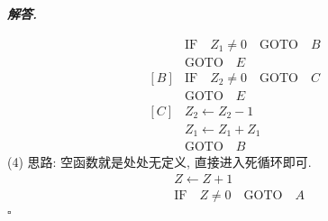 \documentclass[10pt, a4paper, oneside]{ctexart}
\newenvironment{solution}{%
  \par\noindent\textbf{\textit{解答. }}\ignorespaces
}{%
  \hfill\ensuremath{\square}\par
}
\begin{document}
\begin{solution}
\begin{align*}
    [A]& \text{IF} \quad Z_1\neq 0 \quad \text{GOTO} \quad B\\
    &\text{GOTO}\quad  E\\
    [B]& \text{IF} \quad Z_2\neq 0 \quad \text{GOTO} \quad C\\
    &\text{GOTO}\quad  E\\
    [C]& Z_2\leftarrow Z_2-1\\
    &Z_1\leftarrow Z_1+Z_1\\
    &\text{GOTO}\quad  B
\end{align*}
(4) 思路: 空函数就是处处无定义, 直接进入死循环即可.
\begin{align*}
    [A]&Z\leftarrow Z+1\\
    & \text{IF} \quad Z\neq 0 \quad \text{GOTO} \quad A\\
\end{align*}
\end{solution}
\end{document}
